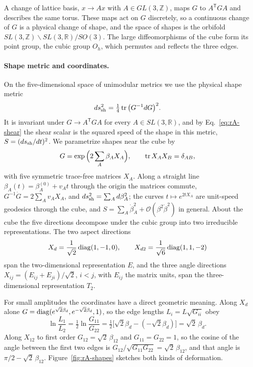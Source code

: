A change of lattice basis, $x\to Ax$ with $A\in GL(3,\mathbb Z)$, maps $G$ to $A^{\mathsf T}GA$ and describes the same torus.
These maps act on $G$ discretely, so a continuous change of $G$ is a physical change of shape, and the space of shapes is the orbifold $SL(3,\mathbb Z)\backslash SL(3,\mathbb R)/SO(3)$.
The large diffeomorphisms of the cube form its point group, the cubic group $O_h$, which permutes and reflects the three edges.

\paragraph{Shape metric and coordinates.}
On the five-dimensional space of unimodular metrics we use the physical shape metric
\begin{equation}
ds^2_{\mathrm{sh}}=\tfrac14\operatorname{tr}\big(G^{-1}dG\big)^2 .
\label{eq:rA-shapemetric}
\end{equation}
It is invariant under $G\to A^{\mathsf T}GA$ for every $A\in SL(3,\mathbb R)$, and by Eq.~\eqref{eq:rA-shear} the shear scalar is the squared speed of the shape in this metric, $S=(ds_{\mathrm{sh}}/dt)^2$.
We parametrize shapes near the cube by
\begin{equation}
G=\exp\Big(2\sum_A\beta_AX_A\Big),\qquad \operatorname{tr} X_AX_B=\delta_{AB},
\label{eq:rA-betaparam}
\end{equation}
with five symmetric trace-free matrices $X_A$.
Along a straight line $\beta_A(t)=\beta_A^{(0)}+v_At$ through the origin the matrices commute, $G^{-1}\dot G=2\sum_Av_AX_A$, and $ds^2_{\mathrm{sh}}=\sum_A d\beta_A^2$; the curves $t\mapsto e^{2tX_A}$ are unit-speed geodesics through the cube, and $S=\sum_A\dot\beta_A^2+\mathcal O(\beta^2\dot\beta^2)$ in general.
About the cube the five directions decompose under the cubic group into two irreducible representations.
The two aspect directions
\begin{equation}
X_d=\frac{1}{\sqrt2}\,{\rm diag}(1,-1,0),\qquad X_{d2}=\frac{1}{\sqrt6}\,{\rm diag}(1,1,-2)
\label{eq:rA-XE}
\end{equation}
span the two-dimensional representation $E$, and the three angle directions $X_{ij}=(E_{ij}+E_{ji})/\sqrt2$, $i<j$, with $E_{ij}$ the matrix units, span the three-dimensional representation $T_2$.

For small amplitudes the coordinates have a direct geometric meaning.
Along $X_d$ alone $G={\rm diag}(e^{\sqrt2\beta_d},e^{-\sqrt2\beta_d},1)$, so the edge lengths $L_i=L\sqrt{G_{ii}}$ obey
\begin{equation}
\ln\frac{L_1}{L_2}=\tfrac12\ln\frac{G_{11}}{G_{22}}=\tfrac12\big[\sqrt2\beta_d-(-\sqrt2\beta_d)\big]=\sqrt2\,\beta_d .
\label{eq:rA-aspect}
\end{equation}
Along $X_{12}$ to first order $G_{12}=\sqrt2\,\beta_{12}$ and $G_{11}=G_{22}=1$, so the cosine of the angle between the first two edges is $G_{12}/\sqrt{G_{11}G_{22}}=\sqrt2\,\beta_{12}$, and that angle is $\pi/2-\sqrt2\,\beta_{12}$.
Figure~\ref{fig:rA-shapes} sketches both kinds of deformation.

